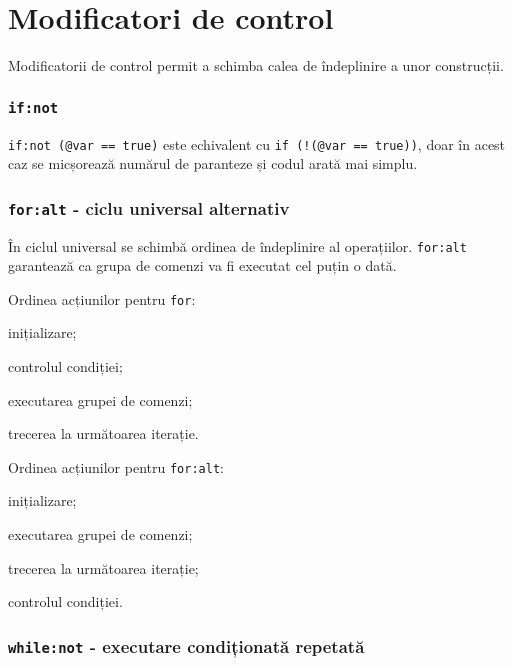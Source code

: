 
\section{Modificatori de control}

\label{sec-modifiers}

Modificatorii de control permit a schimba calea de îndeplinire a unor construcții.

\subsubsection{\lstinline|if:not|}

\lstinline|if:not (@var == true)| este echivalent cu \lstinline|if (!(@var == true))|, doar în acest caz se micșorează numărul de paranteze și codul arată mai simplu.

\subsubsection{\lstinline|for:alt| - ciclu universal alternativ}

În ciclul universal se schimbă ordinea de îndeplinire al operațiilor. \lstinline|for:alt| garantează ca grupa de comenzi va fi executat cel puțin o dată.

Ordinea acțiunilor pentru \lstinline|for|:
\begin{icEnum}
    \item inițializare;
	\item controlul condiției;
	\item executarea grupei de comenzi;
	\item trecerea la următoarea iterație.
\end{icEnum}

Ordinea acțiunilor pentru \lstinline|for:alt|:
\begin{icEnum}
    \item inițializare;
	\item executarea grupei de comenzi;
	\item trecerea la următoarea iterație;
	\item controlul condiției.
\end{icEnum}

\subsubsection{\lstinline|while:not| - executare condiționată repetată}

